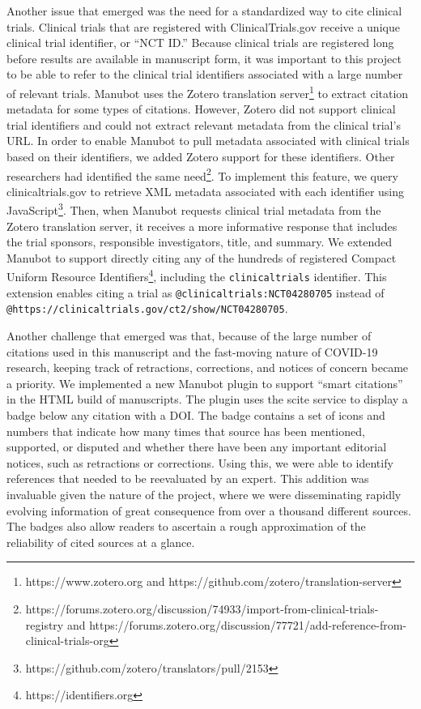 \documentclass[twocolumn]{ceurart}
\begin{document}
Another issue that emerged was the need for a standardized way to cite clinical trials.
Clinical trials that are registered with ClinicalTrials.gov receive a unique clinical trial identifier, or ``NCT ID.''
Because clinical trials are registered long before results are available in manuscript form, it was important to this project to be able to refer to the clinical trial identifiers associated with a large number of relevant trials.
Manubot uses the Zotero translation server\footnote{https://www.zotero.org and https://github.com/zotero/translation-server} to extract citation metadata for some types of citations.
However, Zotero did not support clinical trial identifiers and could not extract relevant metadata from the clinical trial's URL.
In order to enable Manubot to pull metadata associated with clinical trials based on their identifiers, we added Zotero support for these identifiers.
Other researchers had identified the same need\footnote{https://forums.zotero.org/discussion/74933/import-from-clinical-trials-registry and https://forums.zotero.org/discussion/77721/add-reference-from-clinical-trials-org}.
To implement this feature, we query clinicaltrials.gov to retrieve XML metadata associated with each identifier using JavaScript\footnote{https://github.com/zotero/translators/pull/2153}.
Then, when Manubot requests clinical trial metadata from the Zotero translation server, it receives a more informative response that includes the trial sponsors, responsible investigators, title, and summary.
We extended Manubot to support directly citing any of the hundreds of registered Compact Uniform Resource Identifiers\footnote{https://identifiers.org}, including the \texttt{clinicaltrials} identifier.
This extension enables citing a trial as \texttt{@clinicaltrials:NCT04280705} instead of \texttt{@https://clinicaltrials.gov/ct2/show/NCT04280705}.

Another challenge that emerged was that, because of the large number of citations used in this manuscript and the fast-moving nature of COVID-19 research, keeping track of retractions, corrections, and notices of concern became a priority.
We implemented a new Manubot plugin to support ``smart citations'' in the HTML build of manuscripts.
The plugin uses the scite \citep{14UJbLWf4} service to display a badge below any citation with a DOI.
The badge contains a set of icons and numbers that indicate how many times that source has been mentioned, supported, or disputed and whether there have been any important editorial notices, such as retractions or corrections.
Using this, we were able to identify references that needed to be reevaluated by an expert.
This addition was invaluable given the nature of the project, where we were disseminating rapidly evolving information of great consequence from over a thousand different sources.
The badges also allow readers to ascertain a rough approximation of the reliability of cited sources at a glance.
\end{document}
